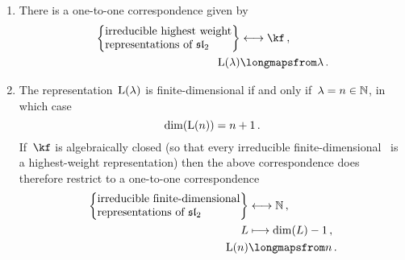 \documentclass[a4paper, 11pt, oneside]{scrartcl}
\begin{document}
\begin{theorem}
  \leavevmode
  \begin{enumerate}
    \item
      There is a one-to-one correspondence given by
      \begin{align*}
        \left\{
          \begin{tabular}{@{}l@{}}
            irreducible highest weight\\
            representations of~$\sllie_2$
          \end{tabular}
        \right\}
        &\longleftrightarrow
        \kf \,,
        \\
        \irred(\lambda)
        &\longmapsfrom
        \lambda \,.
      \end{align*}
    \item
      The representation~$\operatorname{L}(\lambda)$ is finite-dimensional if and only if~$\lambda = n \in \mathbb{N}$, in which case
      \[
        \dim(\operatorname{L}(n))
        =
        n + 1 \,.
      \]
      If~$\kf$ is algebraically closed (so that every irreducible finite-dimensional~ is a highest-weight representation) then the above correspondence does therefore restrict to a one-to-one correspondence
      \begin{align*}
        \left\{
          \begin{tabular}{@{}l@{}}
            irreducible finite-dimensional\\
            representations of~$\sllie_2$
          \end{tabular}
        \right\}
        &\longleftrightarrow
        \Natural \,,
        \\
        L
        &\longmapsto
        \dim(L) - 1 \,,
        \\
        \irred(n)
        &\longmapsfrom
        n \,.
      \end{align*}
  \end{enumerate}
\end{theorem}
\end{document}
